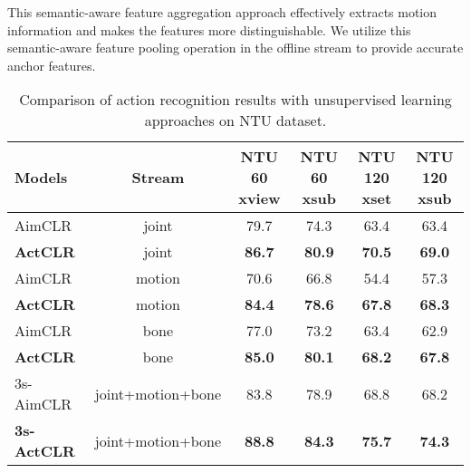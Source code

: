 \documentclass[twocolumn]{article}
\begin{document}
This semantic-aware feature aggregation approach effectively extracts motion information and makes the features more distinguishable. We utilize this semantic-aware feature pooling operation in the offline stream to provide accurate anchor features.



\begin{table*}[tb]
\small
\centering
\caption{Comparison of action recognition results with unsupervised learning approaches on NTU dataset.}
\begin{tabular}{l|c|c|c|c|c}
    \toprule
Models& Stream &NTU 60 xview&NTU 60 xsub&NTU 120 xset&NTU 120 xsub\\
    \midrule
    AimCLR~\cite{guo2021contrastive} & joint & 79.7 & 74.3 & 63.4 & 63.4\\
\textbf{ActCLR} & joint & \textbf{86.7} &\textbf{80.9}&\textbf{70.5} &\textbf{69.0}\\
    \midrule
    AimCLR~\cite{guo2021contrastive} & motion & 70.6 & 66.8 & 54.4 & 57.3\\
\textbf{ActCLR} & motion & \textbf{84.4} &\textbf{78.6}&\textbf{67.8} &\textbf{68.3}\\
    \midrule
    AimCLR~\cite{guo2021contrastive} & bone & 77.0 & 73.2 & 63.4& 62.9\\
\textbf{ActCLR} & bone & \textbf{85.0} &\textbf{80.1}&\textbf{68.2} &\textbf{67.8}\\
    \midrule
    3s-AimCLR~\cite{guo2021contrastive} & \quad joint+motion+bone \quad & 83.8 & 78.9 & 68.8 & 68.2\\
\textbf{3s-ActCLR} & \quad joint+motion+bone \quad & \textbf{88.8} &\textbf{84.3}&\textbf{75.7} &\textbf{74.3}\\
    \bottomrule
\end{tabular}
\label{tab:unsupervised_ntu}
\end{table*}

\vspace{1mm}
\end{document}
